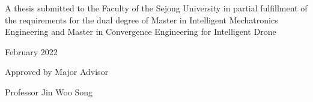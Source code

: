 \documentclass[
11pt, %
english, %
doublespacing, %
liststotoc, %
headsepline, %
]{MastersDoctoralThesis} %
\begin{document}
\begin{titlepage}
	\begin{center}
		
		\vspace*{.01\textheight}
		
		{\bfseries \fontsize{21}{20}\selectfont \ttitle\par}\vspace{3cm} 
		
		{\fontsize{16}{12}\selectfont \authorname\par}\vspace{2cm} 
		
		{\fontsize{14}{12}\selectfont A thesis submitted to the Faculty of the Sejong University in partial fulfillment of the requirements for the dual degree of Master in Intelligent Mechatronics Engineering and Master in Convergence Engineering for Intelligent Drone\par}\vspace{2cm} 
		
		{\fontsize{14}{12}\selectfont February 2022\par}\vspace{2cm} 
		
		{\fontsize{14}{12}\selectfont Approved by Major Advisor \par
			Professor Jin Woo Song}\vspace{2cm} 
		
		\vfill
	\end{center}
\end{titlepage}


\end{document}
